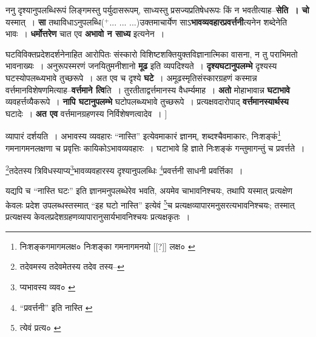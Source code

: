 \documentclass[article,12pt,a4paper]{memoir}
\newcommand{\add}[1]{($^{+}$#1)}
\begin{document}
	  \pstart ननु दृश्यानुपलब्धिरूपं लिङ्गमस्तु पर्युदासरूपम्, साध्यस्तु प्रसज्यप्रतिषेधरूपः किं न भवतीत्याह--\textbf{सेति । चो} यस्मात् । \textbf{सा} तथाविधाऽनुपलब्धि\add{... ... ...}उक्तमाचार्येण साऽ\textbf{भावव्यवहारप्रवर्त्तनी}त्यनेन शब्देनेति भावः । \textbf{धर्मोत्तरेण} चात एव \textbf{अभावो न साध्य} इत्यनेन ।
	\pend
      

	  \pstart घटविविक्तप्र\leavevmode{}देशदर्शनेनाहित आरोपितः संस्कारो विशिष्टशक्तियुक्तविज्ञानात्मिका वासना, न तु पराभिमतो भावनाख्यः । अनुरूपस्मरणं जनयितुमनीशानो \textbf{मूढ} इति व्यपदिश्यते । \textbf{दृश्यघटानुपलम्भे} दृश्यस्य घटस्योपलब्ध्यभावे तुच्छरूपे । अत एव च दृश्ये \textbf{घटे} । अमूढस्मृतिसंस्कारग्रहणं कस्मान्न वर्त्तमानविशेषणमित्याह--\textbf{वर्त्तमाने त्वि}ति । तुरतीताद्वर्त्तमानस्य वैधर्म्यमाह । \textbf{अतो} मोहाभावान्न \textbf{घटाभावे} व्यवहर्त्तव्यैकरूपे । \textbf{नापि घटानुपलम्भे} घटोपलब्ध्यभावे तुच्छरूपे । प्रत्यक्षवदारोपाद् \textbf{वर्त्तमानस्यार्थस्य} घटादेः । \textbf{अत एव} वर्त्तमानग्रहणस्य निर्विशेषणत्वादेव ।
	\pend
      [[अस्पष्टम्--सं०]]\leavevmode{}
	  \bigskip
	  \begingroup
	

	  \pstart व्यापारं दर्शयति । अभावस्य व्यवहारः “नास्ति” इत्येवमाकारं ज्ञानम्, शब्दश्चैवमाकारः, निःशङ्कं\footnote{निःशङ्कगमागमलक्ष० \cite{dp-msD} \cite{dp-msB} निःशङ्का गमनागमनयो [[?]] लक्ष० \cite{dp-msC}} गमनागमनलक्षणा च प्रवृत्तिः कायिकोऽभावव्यवहारः । घटाभावे हि ज्ञाते निःशङ्कं गन्तुमागन्तुं च प्रवर्त्तते ।
	\pend
       

	  \pstart \footnote{तदेवमस्य \cite{dp-msC} \cite{dp-msD} तदेवमेतस्य \cite{dp-msA} \cite{dp-edP} \cite{dp-edH} \cite{dp-edE} \cite{dp-edN} तदेव तस्य--\cite{dp-msB}}तदेतस्य त्रिविधस्याप्य\footnote{प्यभावस्य व्यव० \cite{dp-msC}}भावव्यवहारस्य दृश्यानुपलब्धिः \footnote{“प्रवर्त्तनी” इति नास्ति \cite{dp-msA} \cite{dp-msB} \cite{dp-msC} \cite{dp-msD} \cite{dp-edP} \cite{dp-edH} \cite{dp-edE} \cite{dp-edN}}प्रवर्त्तनी साधनी प्रवर्त्तिका ।
	\pend
       

	  \pstart यद्यपि च “नास्ति घटः” इति ज्ञानमनुपलब्धेरेव भवति, अयमेव चाभावनिश्चयः, तथापि यस्मात् प्रत्यक्षेण केवलः प्रदेश उपलब्धस्तस्मात् “इह घटो नास्ति” इत्येवं \footnote{त्येवं प्रत्य० \cite{dp-msC}}च प्रत्यक्षव्यापारमनुसरत्यभावनिश्चयः; तस्मात् प्रत्यक्षस्य केवलप्रदेशग्रहणव्यापारानुसार्यभावनिश्चयः प्रत्यक्षकृतः ।
	\pend
      
	  \endgroup
	
\end{document}
